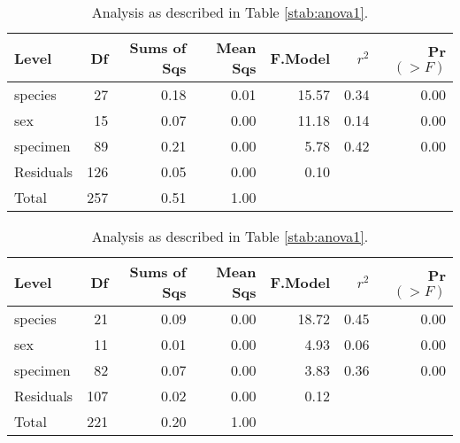 \begin{table}[ht]
\centering
\begin{tabular}{lrrrrrr}
  \hline
 Level & Df & Sums of Sqs & Mean Sqs & F.Model & $r^2$ & Pr$(>F)$ \\ 
  \hline
  species &  27 & 0.18 & 0.01 & 15.57 & 0.34 & 0.00 \\ 
  sex &  15 & 0.07 & 0.00 & 11.18 & 0.14 & 0.00 \\ 
  specimen &  89 & 0.21 & 0.00 & 5.78 & 0.42 & 0.00 \\ 
  Residuals & 126 & 0.05 & 0.00 & 0.10 &  &  \\ 
  Total & 257 & 0.51 & 1.00 &  &  &  \\ 
   \hline
\end{tabular}
\caption{
Analysis as described in Table  \ref{stab:anova1}.
}
\end{table}


\begin{table}[ht]
\centering
\begin{tabular}{lrrrrrr}
  \hline
 Level & Df & Sums of Sqs & Mean Sqs & F.Model & $r^2$ & Pr$(>F)$ \\ 
  \hline
  species &  21 & 0.09 & 0.00 & 18.72 & 0.45 & 0.00 \\ 
  sex &  11 & 0.01 & 0.00 & 4.93 & 0.06 & 0.00 \\ 
  specimen &  82 & 0.07 & 0.00 & 3.83 & 0.36 & 0.00 \\ 
  Residuals & 107 & 0.02 & 0.00 & 0.12 &  &  \\ 
  Total & 221 & 0.20 & 1.00 &  &  &  \\ 
   \hline
\end{tabular}
\caption{
Analysis as described in Table  \ref{stab:anova1}.
}
\end{table}

